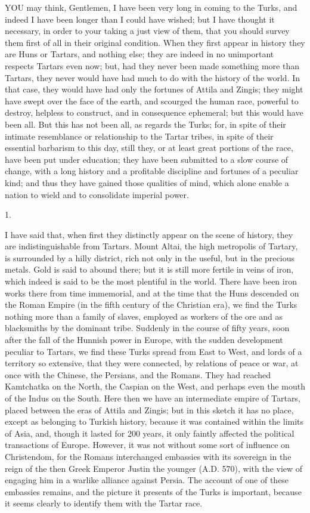 YOU
may think, Gentlemen, I have been very long in coming to the Turks,
and indeed I have been longer than I could have wished; but I have
thought it necessary, in order to your taking a just view of them,
that you should survey them first of all in their original condition.
When they first appear in history they are Huns or Tartars, and
nothing else; they are indeed in no unimportant respects Tartars even
now; but, had they never been made something more than Tartars, they
never would have had much to do with the history of the world. In that
case, they would have had only the fortunes of Attila and Zingis; they
might have swept over the face of the earth, and scourged the human
race, powerful to destroy, helpless to construct, and in consequence
ephemeral; but this would have been all. But this has not been all, as
regards the Turks; for, in spite of their intimate resemblance or
relationship to the Tartar tribes, in spite of their essential
barbarism to this day, still they, or at least great portions of the
race, have been put under education; they have been submitted to a
slow course of change, with a long history and a profitable discipline
and fortunes of a peculiar kind; and thus they have gained those
qualities of mind, which alone enable a nation to wield and to
consolidate imperial power.

1.

I have said that, when first
they distinctly appear on the scene of history, they are
indistinguishable from Tartars. Mount Altai, the high metropolis of
Tartary, is surrounded by a hilly district, rich not only in the
useful, but in the precious metals. Gold is said to abound there; but
it is still more fertile in veins of iron, which indeed is said to be
the most plentiful in the world. There have been iron works there from
time immemorial, and at the time that the Huns descended on the Roman
Empire (in the fifth century of the Christian era), we find the Turks
nothing more than a family of slaves, employed as workers of the ore
and as blacksmiths by the dominant tribe. Suddenly in the course of
fifty years, soon after the fall of the Hunnish power in Europe, with
the sudden development peculiar to Tartars, we find these Turks spread
from East to West, and lords of a territory so extensive, that they
were connected, by relations of peace or war, at once with the
Chinese, the Persians, and the Romans. They had reached Kamtchatka on
the North, the Caspian on the West, and perhaps even the mouth of the
Indus on the South. Here then we have an intermediate empire of
Tartars, placed between the eras of Attila and Zingis; but in this
sketch it has no place, except as belonging to Turkish history,
because it was contained within the limits of Asia, and, though it
lasted for 200 years, it only faintly affected the political
transactions of Europe. However, it was not without some sort of
influence on Christendom, for the Romans interchanged embassies with
its sovereign in the reign of the then Greek Emperor Justin the
younger (A.D.
570), with the view of engaging him in a warlike alliance against
Persia. The account of one of these embassies remains, and the picture
it presents of the Turks is important, because it seems clearly to
identify them with the Tartar race.

